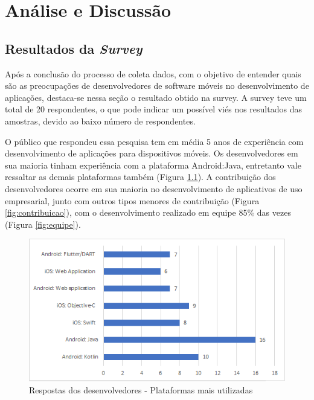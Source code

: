 \chapter{\label{chap:intro}Análise e Discussão}
 




\section{Resultados da \textit{Survey}}

Após a conclusão do processo de coleta dados, com o objetivo de entender quais são as preocupações de desenvolvedores de software móveis no desenvolvimento de aplicações, destaca-se nessa seção o resultado obtido na survey. A survey teve um total de 20 respondentes, o que pode indicar um possível viés nos resultados das amostras, devido ao baixo número de respondentes.

O público que respondeu essa pesquisa tem em média 5 anos de experiência com desenvolvimento de aplicações  para dispositivos móveis. Os desenvolvedores em sua maioria tinham experiência com a plataforma Android:Java, entretanto vale ressaltar as demais plataformas também (Figura \ref{fig:plataformas}). A contribuição dos desenvolvedores ocorre em sua maioria no desenvolvimento de aplicativos de uso empresarial, junto com outros tipos menores de contribuição (Figura \ref{fig:contribuicao}), com o desenvolvimento realizado em equipe 85{\%} das vezes (Figura \ref{fig:equipe}).

\begin{figure}[!b]
\vspace{1.8cm}
\centering
\includegraphics[scale=0.8]{fig/plataformas.PNG}
\caption{Respostas dos desenvolvedores - Plataformas mais utilizadas}
\label{fig:plataformas}

\end{figure}

